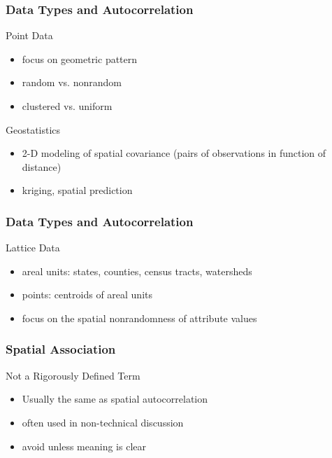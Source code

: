 \documentclass[nototal]{beamer}
\begin{document}
\begin{frame}
    \frametitle{Data Types and Autocorrelation}
    \begin{block}{Point Data}
      \begin{itemize}
        \item focus on geometric pattern
        \item random vs. nonrandom
        \item clustered vs. uniform
      \end{itemize}
    \end{block}
    \begin{block}{Geostatistics}
      \begin{itemize}
        \item 2-D modeling of spatial covariance (pairs of observations in
          function of distance)
        \item kriging, spatial prediction
      \end{itemize}
    \end{block}
\end{frame}


\begin{frame}
    \frametitle{Data Types and Autocorrelation}
    \begin{block}{Lattice Data}
      \begin{itemize}
        \item areal units: states, counties, census tracts, watersheds
        \item points: centroids of areal units
        \item focus on the spatial nonrandomness of attribute values
      \end{itemize}
    \end{block}
\end{frame}


\begin{frame}
    \frametitle{Spatial Association}
    \begin{block}{Not a Rigorously Defined Term}
      \begin{itemize}
        \item Usually the same as spatial autocorrelation
        \item often used in non-technical discussion
        \item avoid unless meaning is clear
      \end{itemize}
    \end{block}
\end{frame}
\end{document}
